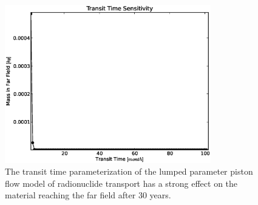 \begin{frame}[ctb!]
\begin{figure}[ht]
\centering
\includegraphics[width=0.8\textwidth]{./images/lpPFM_t_t.eps}
\caption[Lumped Parameter Piston Flow Model Transit Time Sensitivity]{The transit time 
parameterization of the lumped parameter piston flow model of radionuclide 
transport has a strong effect on the material reaching the far field after 30 
years.  }
\label{fig:lp_t_t_end}
\end{figure}
\end{frame}

